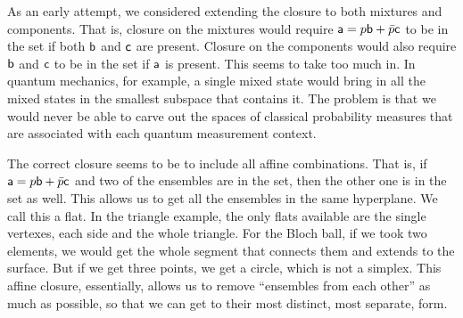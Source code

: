 As an early attempt, we considered extending the closure to both mixtures and components. That is, closure on the mixtures would require $\ens[a] = p \ens[b] + \bar{p} \ens[c]$ to be in the set if both $\ens[b]$ and $\ens[c]$ are present. Closure on the components would also require $\ens[b]$ and $\ens[c]$ to be in the set if $\ens[a]$ is present. This seems to take too much in. In quantum mechanics, for example, a single mixed state would bring in all the mixed states in the smallest subspace that contains it. The problem is that we would never be able to carve out the spaces of classical probability measures that are associated with each quantum measurement context.

The correct closure seems to be to include all affine combinations. That is, if $\ens[a] = p \ens[b] + \bar{p} \ens[c]$ and two of the ensembles are in the set, then the other one is in the set as well. This allows us to get all the ensembles in the same hyperplane. We call this a flat. In the triangle example, the only flats available are the single vertexes, each side and the whole triangle. For the Bloch ball, if we took two elements, we would get the whole segment that connects them and extends to the surface. But if we get three points, we get a circle, which is not a simplex. This affine closure, essentially, allows us to remove ``ensembles from each other'' as much as possible, so that we can get to their most distinct, most separate, form.


